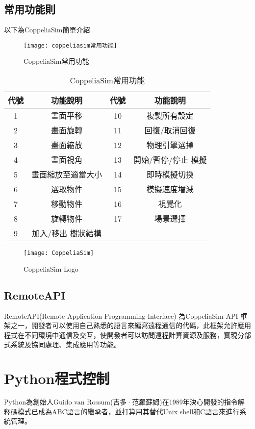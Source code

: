 \subsection{常用功能則}
以下為CoppeliaSim簡單介紹

\begin{figure}[hbt!]
\center
\texttt{[image: coppeliasim常用功能]}
\caption{\Large CoppeliaSim常用功能}
\label{coppeliasim常用功能}
\end{figure}

\begin{table}[htbp]
  \centering
  \large
  \caption{\Large CoppeliaSim常用功能}
  \setlength{\tabcolsep}{0.7cm}
  \begin{tabular}{|c|c|c|c|}
    \hline
    代號 & 功能說明 & 代號 & 功能說明 \\
    \hline
    1 & 畫面平移 & 10 & 複製所有設定 \\
    \hline
    2 & 畫面旋轉 & 11 & 回復/取消回復 \\
    \hline
    3 & 畫面縮放 & 12 & 物理引擎選擇 \\
    \hline
    4 & 畫面視角 & 13 & 開始/暫停/停止 模擬 \\
    \hline
    5 & 畫面縮放至適當大小 & 14 & 即時模擬切換 \\
    \hline
    6 & 選取物件 & 15 & 模擬速度增減 \\
    \hline
    7 & 移動物件 & 16 & 視覺化 \\
    \hline
    8 & 旋轉物件 & 17 & 場景選擇 \\
    \hline
    9 & 加入/移出 樹狀結構 & & \\
    \hline
  \end{tabular}
\end{table}

\begin{figure}[hbt!]
\center
\texttt{[image: CoppeliaSim]}
\caption{\Large CoppeliaSim Logo}
\end{figure}

\subsection{RemoteAPI}
RemoteAPI(Remote Application Programming Interface) 為CoppeliaSim API 框架之一，開發者可以使用自己熟悉的語言來編寫遠程通信的代碼，此框架允許應用程式在不同環境中通信及交互，使開發者可以訪問遠程計算資源及服務，實現分部式系統及協同處理、集成應用等功能。\\

\section{Python程式控制}
Python為創始人Guido van Rossum(吉多·范羅蘇姆)在1989年決心開發的指令解釋碼模式已成為ABC語言的繼承者，並打算用其替代Unix shell和C語言來進行系統管理。\\

